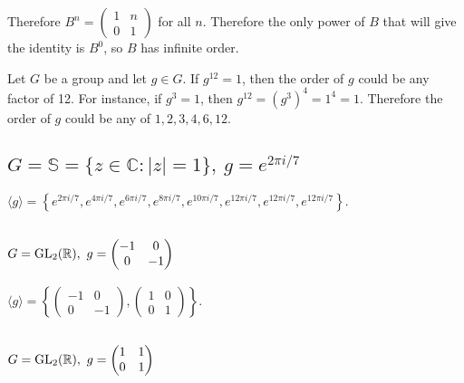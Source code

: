\documentclass[a4paper]{article}
\begin{document}
Therefore $B^n = \begin{pmatrix} 1 & n\\ 0 & 1 \end{pmatrix}$ for all $n$. Therefore the only power of $B$ that will give the identity is $B^0$, so $B$ has infinite order.


Let $G$ be a group and let $g \in G$. If $g^{12} = 1$, then the order of $g$ could be any factor of 12. For instance, if $g^3 = 1$, then $g^{12} = \left(g^3\right)^4 = 1^4 = 1$. Therefore the order of $g$ could be any of $1, 2, 3, 4, 6, 12$.


\subsection{$G = \mathbb S = \{z \in \mathbb C : |z| = 1\},\ g = e^{2 \pi i / 7}$}

$\langle g \rangle = \left\{ e^{2 \pi i / 7}, e^{4 \pi i / 7}, e^{6 \pi i / 7}, e^{8 \pi i / 7}, e^{10 \pi i / 7}, e^{12 \pi i / 7}, e^{12 \pi i / 7}, e^{12 \pi i / 7} \right\}$.

\subsection{$G = \text{\normalfont GL}_2(\mathbb R),\ g = \begin{pmatrix} -1 & 0\\ 0 & -1 \end{pmatrix}$}

$\langle g \rangle = \left\{ \begin{pmatrix}-1 & 0\\ 0 & -1\end{pmatrix}, \begin{pmatrix}1 & 0\\ 0 & 1\end{pmatrix} \right\}$.

\subsection{$G = \text{\normalfont GL}_2(\mathbb R),\ g = \begin{pmatrix} 1 & 1\\ 0 & 1 \end{pmatrix}$}
\end{document}

